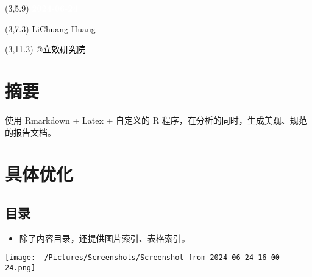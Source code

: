 \documentclass[
]{article}
\author{}
\date{\vspace{-2.5em}}
\providecommand{\tightlist}{%
  \setlength{\itemsep}{0pt}\setlength{\parskip}{0pt}}
\begin{document}
\begin{titlepage} 
\begin{center} \textbf{\Huge } \vspace{4em}
\begin{textblock}{10}(3,5.9) \huge
\textbf{\textcolor{white}{2024-06-24}}
\end{textblock} \begin{textblock}{10}(3,7.3)
\Large \textcolor{black}{LiChuang Huang}
\end{textblock} \begin{textblock}{10}(3,11.3)
\Large \textcolor{black}{@立效研究院}
\end{textblock} \end{center} \end{titlepage}
\restoregeometry


\begin{center}\vspace{1.5cm}\end{center}\tableofcontents

\newpage


\hypertarget{ux6458ux8981}{%
\section{摘要}\label{ux6458ux8981}}

使用 Rmarkdown + Latex + 自定义的 R 程序，在分析的同时，生成美观、规范的报告文档。

\hypertarget{ux5177ux4f53ux4f18ux5316}{%
\section{具体优化}\label{ux5177ux4f53ux4f18ux5316}}

\hypertarget{ux76eeux5f55}{%
\subsection{目录}\label{ux76eeux5f55}}

\begin{itemize}
\tightlist
\item
  除了内容目录，还提供图片索引、表格索引。
\end{itemize}

\def\@captype{figure}
\begin{center}
\texttt{[image: ~/Pictures/Screenshots/Screenshot from 2024-06-24 16-00-24.png]}
\caption{Unnamed chunk 5}\label{fig:unnamed-chunk-5}
\end{center}
\end{document}
